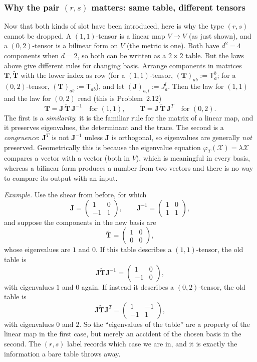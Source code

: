 \documentclass[11pt]{article}
\begin{document}
\subsubsection*{Why the pair $(r,s)$ matters: same table, different tensors}
Now that both kinds of slot have been introduced, here is why the type $(r,s)$ cannot be dropped. A $(1,1)$-tensor is a linear map $V\to V$ (as just shown), and a $(0,2)$-tensor is a bilinear form on $V$ (the metric is one). Both have $d^2=4$ components when $d=2$, so both can be written as a $2\times2$ table. But the laws above give different rules for changing basis. Arrange components in matrices $\mathbf T,\tilde{\mathbf T}$ with the lower index as row (for a $(1,1)$-tensor, $(\mathbf T)_{ab}:=\mathsf T^b_a$; for a $(0,2)$-tensor, $(\mathbf T)_{ab}:=\mathsf T_{ab}$), and let $(\mathbf J)_{a,l}:=J^l_a$. Then the law for $(1,1)$ and the law for $(0,2)$ read (this is Problem~2.12)
\[
\mathbf T=\mathbf J\,\tilde{\mathbf T}\,\mathbf J^{-1}\quad\text{for }(1,1),\qquad \mathbf T=\mathbf J\,\tilde{\mathbf T}\,\mathbf J^{T}\quad\text{for }(0,2).
\]
The first is a \emph{similarity}: it is the familiar rule for the matrix of a linear map, and it preserves eigenvalues, the determinant and the trace. The second is a \emph{congruence}: $\mathbf J^T$ is not $\mathbf J^{-1}$ unless $\mathbf J$ is orthogonal, so eigenvalues are generally \emph{not} preserved. Geometrically this is because the eigenvalue equation $\varphi_T(\mathcal X)=\lambda\mathcal X$ compares a vector with a vector (both in $V$), which is meaningful in every basis, whereas a bilinear form produces a number from two vectors and there is no way to compare its output with an input.

\smallskip
\noindent\emph{Example.} Use the shear from before, for which
\[
\mathbf J=\begin{pmatrix}1&0\\-1&1\end{pmatrix},\qquad \mathbf J^{-1}=\begin{pmatrix}1&0\\1&1\end{pmatrix},
\]
and suppose the components in the new basis are
\[
\tilde{\mathbf T}=\begin{pmatrix}1&0\\0&0\end{pmatrix},
\]
whose eigenvalues are $1$ and $0$. If this table describes a $(1,1)$-tensor, the old table is
\[
\mathbf J\tilde{\mathbf T}\mathbf J^{-1}=\begin{pmatrix}1&0\\-1&0\end{pmatrix},
\]
with eigenvalues $1$ and $0$ again. If instead it describes a $(0,2)$-tensor, the old table is
\[
\mathbf J\tilde{\mathbf T}\mathbf J^{T}=\begin{pmatrix}1&-1\\-1&1\end{pmatrix},
\]
with eigenvalues $0$ and $2$. So the ``eigenvalues of the table'' are a property of the linear map in the first case, but merely an accident of the chosen basis in the second. The $(r,s)$ label records which case we are in, and it is exactly the information a bare table throws away.
\end{document}
